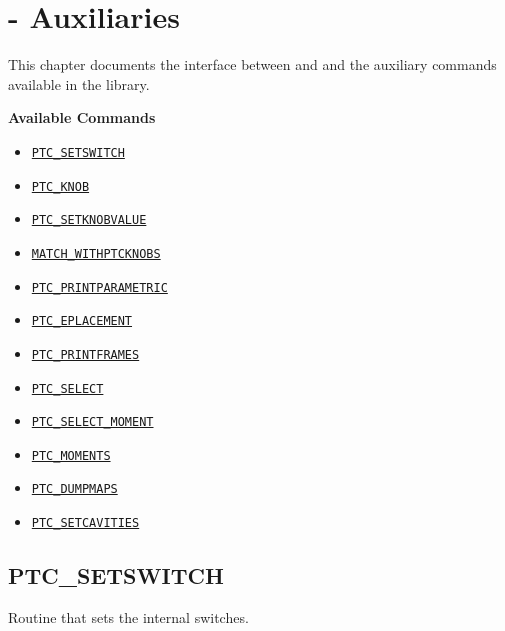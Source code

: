 
\chapter{{\madx}-{\ptc} Auxiliaries}
\label{chap:ptc_auxiliaries}

This chapter documents the interface between \madx and \ptc and the
auxiliary commands available in the \ptc library.

{\bf Available Commands }
\begin{itemize}
   \item \hyperref[sec:ptc_setswitch]{\tt PTC\_SETSWITCH}
   \item \hyperref[sec:ptc_knob]{\tt PTC\_KNOB}
   \item \hyperref[sec:ptc_setknobvalue]{\tt PTC\_SETKNOBVALUE}
   \item \hyperref[sec:match_withptcknobs]{\tt MATCH\_WITHPTCKNOBS}  
   \item \hyperref[sec:ptc_printparametric]{\tt PTC\_PRINTPARAMETRIC}
   \item \hyperref[sec:ptc_eplacement]{\tt PTC\_EPLACEMENT}
   \item \hyperref[sec:ptc_printframes]{\tt PTC\_PRINTFRAMES}
   \item \hyperref[sec:ptc_select]{\tt PTC\_SELECT}
   \item \hyperref[sec:ptc_select_moment]{\tt PTC\_SELECT\_MOMENT}
   \item \hyperref[sec:ptc_moments]{\tt PTC\_MOMENTS}  
   \item \hyperref[sec:ptc_dumpmaps]{\tt PTC\_DUMPMAPS}
   \item \hyperref[sec:ptc_setcavities]{\tt PTC\_SETCAVITIES}
\end{itemize}

\newpage

\section{PTC\_SETSWITCH}
\label{sec:ptc_setswitch}

Routine that sets the internal \ptc switches.


